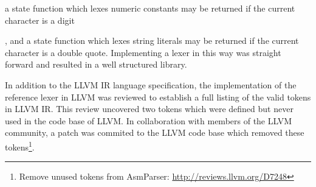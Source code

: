 a state function which lexes numeric constants may be returned if the current character is a digit

, and a state function which lexes string literals may be returned if the current character is a double quote. Implementing a lexer in this way was straight forward and resulted in a well structured library.

In addition to the LLVM IR language specification, the implementation of the reference lexer in LLVM was reviewed to establish a full listing of the valid tokens in LLVM IR. This review uncovered two tokens which were defined but never used in the code base of LLVM. In collaboration with members of the LLVM community, a patch was commited to the LLVM code base which removed these tokens\footnote{Remove unused tokens from AsmParser: \url{http://reviews.llvm.org/D7248}}.



%


%

%


%
%
%
%
%
%





